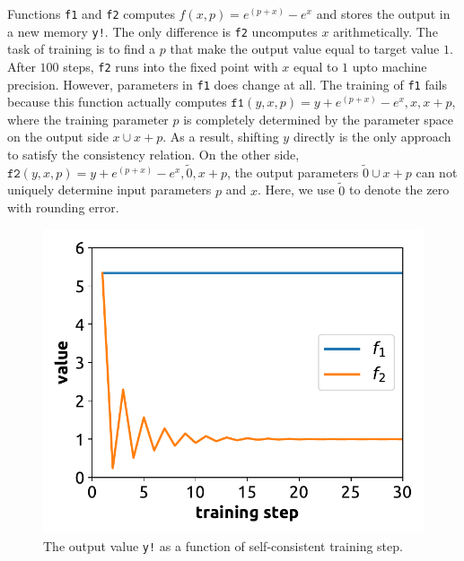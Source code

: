 \documentclass[aps,twocolumn,longbibliography,english,superscriptaddress]{revtex4-1}
\newcommand{\<}{\langle}
\renewcommand{\>}{\rangle}
\theoremstyle{definition}\newtheorem{definition}{\textit{Definition}}
\begin{document}
Functions \texttt{f1} and \texttt{f2} computes $f(x, p) = e^{(p+x)} - e^x$ and stores the output in a new memory \texttt{y!}.
The only difference is \texttt{f2} uncomputes $x$ arithmetically.
The task of training is to find a $p$ that make the output value equal to target value $1$.
After $100$ steps, \texttt{f2} runs into the fixed point with $x$ equal to $1$ upto machine precision.
However, parameters in \texttt{f1} does change at all.
The training of \texttt{f1} fails because this function actually computes $\texttt{f1}(y, x, p) = y + e^{(p+x)} - e^{x}, x, x+p$, where the training parameter $p$ is completely determined by the parameter space on the output side $x \cup x+p$. As a result, shifting $y$ directly is the only approach to satisfy the consistency relation. On the other side, $\texttt{f2}(y, x, p) = y + e^{(p+x)} - e^x, \tilde{0}, x+p$, the output parameters $\tilde{0} \cup x+p$ can not uniquely determine input parameters $p$ and $x$. Here, we use $\tilde{0}$ to denote the zero with rounding error.

\begin{figure}
    \centerline{\includegraphics[width=0.9\columnwidth,trim={0 0.3cm 0 0},clip]{images/fig1.pdf}}
    \caption{The output value \texttt{y!} as a function of self-consistent training step.}\label{fig:invtrain}
\end{figure}
\end{document}
